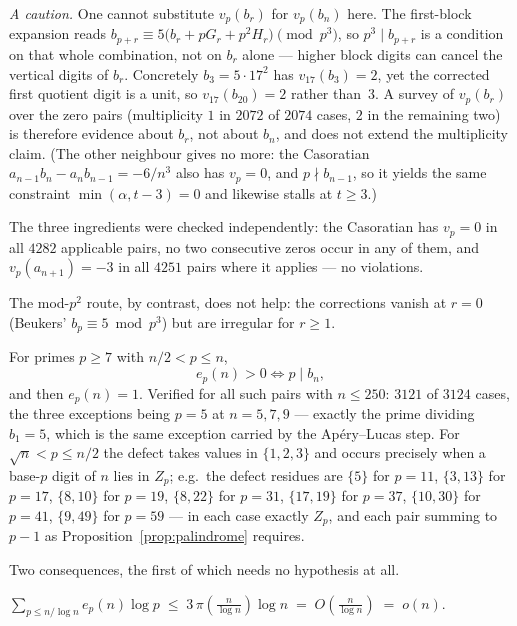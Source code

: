 \emph{A caution.}  One cannot substitute $v_p(b_r)$ for $v_p(b_n)$ here.  The first-block
expansion reads $b_{p+r}\equiv5\bigl(b_r+pG_r+p^2H_r\bigr)\pmod{p^3}$, so $p^3\mid b_{p+r}$ is a
condition on that whole combination, not on $b_r$ alone — higher block digits can cancel the
vertical digits of $b_r$.  Concretely $b_3=5\cdot17^2$ has $v_{17}(b_3)=2$, yet the corrected
first quotient digit is a unit, so $v_{17}(b_{20})=2$ rather than~$3$.  A survey of $v_p(b_r)$
over the zero pairs (multiplicity $1$ in $2072$ of $2074$ cases, $2$ in the remaining two) is
therefore evidence about $b_r$, not about $b_n$, and does not extend the multiplicity claim.  (The other neighbour gives no more: the Casoratian
$a_{n-1}b_n-a_nb_{n-1}=-6/n^3$ also has $v_p=0$, and $p\nmid b_{n-1}$, so it yields the same
constraint $\min(\alpha,t-3)=0$ and likewise stalls at $t\ge3$.)

The three ingredients were checked independently: the Casoratian has $v_p=0$ in all $4282$
applicable pairs, no two consecutive zeros occur in any of them, and $v_p(a_{n+1})=-3$ in all
$4251$ pairs where it applies — no violations.

The mod-$p^2$ route, by contrast, does not help: the corrections vanish at $r=0$ (Beukers'
$b_p\equiv5\bmod p^3$) but are irregular for $r\ge1$.

\begin{proposition}\label{prop:defect}
For primes $p\ge7$ with $n/2<p\le n$,
\[
  e_p(n)>0\iff p\mid b_n ,
\]
and then $e_p(n)=1$.  Verified for all such pairs with $n\le250$: $3121$ of $3124$ cases,
the three exceptions being $p=5$ at $n=5,7,9$ — exactly the prime dividing $b_1=5$, which is
the same exception carried by the Ap\'ery--Lucas step.  For $\sqrt n<p\le n/2$ the defect
takes values in $\{1,2,3\}$ and occurs precisely when a base-$p$ digit of $n$ lies in
$Z_p$; e.g.\ the defect residues are $\{5\}$ for $p=11$, $\{3,13\}$ for $p=17$,
$\{8,10\}$ for $p=19$, $\{8,22\}$ for $p=31$, $\{17,19\}$ for $p=37$, $\{10,30\}$ for
$p=41$, $\{9,49\}$ for $p=59$ — in each case exactly $Z_p$, and each pair summing to $p-1$
as Proposition~\ref{prop:palindrome} requires.
\end{proposition}

Two consequences, the first of which needs no hypothesis at all.

\begin{lemma}[unconditional]\label{lem:small-primes}
$\displaystyle\sum_{p\le n/\log n}e_p(n)\log p\;\le\;3\,\pi\!\left(\frac n{\log n}\right)\log n
 \;=\;O\!\left(\frac n{\log n}\right)\;=\;o(n).$
\end{lemma}

